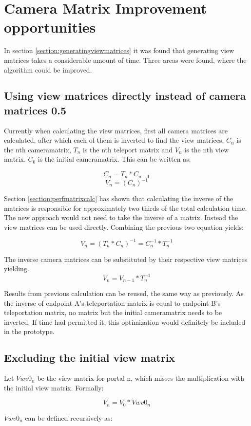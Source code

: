\section{Camera Matrix Improvement opportunities}
In section \ref{section:generatingviewmatrices} it was found that generating view matrices takes a considerable amount of time. Three areas were found, where the algorithm could be improved.

\subsection{Using view matrices directly instead of camera matrices 0.5}
Currently when calculating the view matrices, first all camera matrices are calculated, after which each of them is inverted to find the view matrices. $C_n$ is the nth \gls{cameramatrix}, $T_n$ is the nth teleport matrix and $V_n$ is the nth view matrix. $C_0$ is the initial \gls{cameramatrix}. This can be written as:

$$C_n = T_{n} * C_{n-1}$$
$$V_n = (C_{n})^{-1}$$

Section \ref{section:perfmatrixcalc} has shown that calculating the inverse of the matrices is responsible for approximately two thirds of the total calculation time. The new approach would not need to take the inverse of a matrix. Instead the view matrices can be used directly.
Combining the previous two equation yields:

$$V_n = (T_n * C_n)^{-1} = C_n^{-1} * T_n^{-1}$$

The inverse camera matrices can be substituted by their respective view matrices yielding.
$$V_n = V_{n-1} * T_n^{-1}$$

Results from previous calculation can be reused, the same way as previously. As the inverse of \gls{endpoint} A's teleportation matrix is equal to \gls{endpoint} B's teleportation matrix, no matrix but the initial \gls{cameramatrix} needs to be inverted. If time had permitted it, this optimization would definitely be included in the prototype.

\subsection{Excluding the initial view matrix}
\label{section:noveiw}
Let $Vwv0_n$ be the view matrix for portal n, which misses the multiplication with the initial view matrix. Formally:

$$V_n = V_0 * Vwv0_n$$

$Vwv0_n$ can be defined recursively as:

